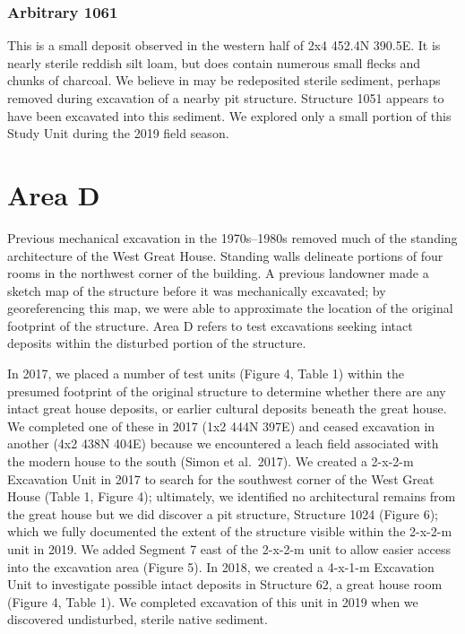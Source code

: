 \documentclass[
  12pt,
]{krantz}
\begin{document}
\hypertarget{arbitrary-1061}{%
\subsubsection{Arbitrary 1061}\label{arbitrary-1061}}

This is a small deposit observed in the western half of 2x4 452.4N
390.5E. It is nearly sterile reddish silt loam, but does contain
numerous small flecks and chunks of charcoal. We believe in may be
redeposited sterile sediment, perhaps removed during excavation of a
nearby pit structure. Structure 1051 appears to have been excavated into
this sediment. We explored only a small portion of this Study Unit
during the 2019 field season.

\hypertarget{area-d}{%
\section{Area D}\label{area-d}}

Previous mechanical excavation in the 1970s--1980s removed much of the
standing architecture of the West Great House. Standing walls delineate
portions of four rooms in the northwest corner of the building. A
previous landowner made a sketch map of the structure before it was
mechanically excavated; by georeferencing this map, we were able to
approximate the location of the original footprint of the structure.
Area D refers to test excavations seeking intact deposits within the
disturbed portion of the structure.

In 2017, we placed a number of test units (Figure 4, Table 1) within the
presumed footprint of the original structure to determine whether there
are any intact great house deposits, or earlier cultural deposits
beneath the great house. We completed one of these in 2017 (1x2 444N
397E) and ceased excavation in another (4x2 438N 404E) because we
encountered a leach field associated with the modern house to the south
(Simon et al.~2017). We created a 2-x-2-m Excavation Unit in 2017 to
search for the southwest corner of the West Great House (Table 1, Figure
4); ultimately, we identified no architectural remains from the great
house but we did discover a pit structure, Structure 1024 (Figure 6);
which we fully documented the extent of the structure visible within the
2-x-2-m unit in 2019. We added Segment 7 east of the 2-x-2-m unit to
allow easier access into the excavation area (Figure 5). In 2018, we
created a 4-x-1-m Excavation Unit to investigate possible intact
deposits in Structure 62, a great house room (Figure 4, Table 1). We
completed excavation of this unit in 2019 when we discovered
undisturbed, sterile native sediment.
\end{document}
